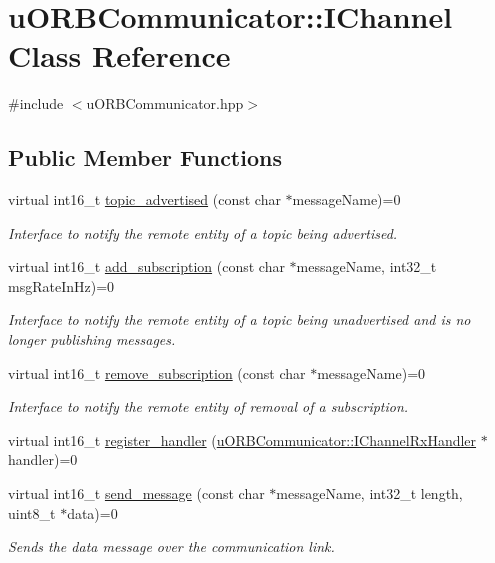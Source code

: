 \hypertarget{classuORBCommunicator_1_1IChannel}{}\section{u\+O\+R\+B\+Communicator\+:\+:I\+Channel Class Reference}
\label{classuORBCommunicator_1_1IChannel}


{\ttfamily \#include $<$u\+O\+R\+B\+Communicator.\+hpp$>$}

\subsection*{Public Member Functions}
\begin{DoxyCompactItemize}
\item 
virtual int16\+\_\+t \hyperlink{classuORBCommunicator_1_1IChannel_a77ca809a54e4d7a0137e89eeba22d17f}{topic\+\_\+advertised} (const char $\ast$message\+Name)=0
\begin{DoxyCompactList}\small\item\em Interface to notify the remote entity of a topic being advertised. \end{DoxyCompactList}\item 
virtual int16\+\_\+t \hyperlink{classuORBCommunicator_1_1IChannel_a2fdcab300f1c9ccf8c43858493ca9358}{add\+\_\+subscription} (const char $\ast$message\+Name, int32\+\_\+t msg\+Rate\+In\+Hz)=0
\begin{DoxyCompactList}\small\item\em Interface to notify the remote entity of a topic being unadvertised and is no longer publishing messages. \end{DoxyCompactList}\item 
virtual int16\+\_\+t \hyperlink{classuORBCommunicator_1_1IChannel_a74420541552346f0367d802b5c61714a}{remove\+\_\+subscription} (const char $\ast$message\+Name)=0
\begin{DoxyCompactList}\small\item\em Interface to notify the remote entity of removal of a subscription. \end{DoxyCompactList}\item 
virtual int16\+\_\+t \hyperlink{classuORBCommunicator_1_1IChannel_aba1c6e430848e447334c5be5c06e1d14}{register\+\_\+handler} (\hyperlink{classuORBCommunicator_1_1IChannelRxHandler}{u\+O\+R\+B\+Communicator\+::\+I\+Channel\+Rx\+Handler} $\ast$handler)=0
\item 
virtual int16\+\_\+t \hyperlink{classuORBCommunicator_1_1IChannel_a3f4690d7b897f5f568cfed2c31d7b734}{send\+\_\+message} (const char $\ast$message\+Name, int32\+\_\+t length, uint8\+\_\+t $\ast$data)=0
\begin{DoxyCompactList}\small\item\em Sends the data message over the communication link. \end{DoxyCompactList}\end{DoxyCompactItemize}


